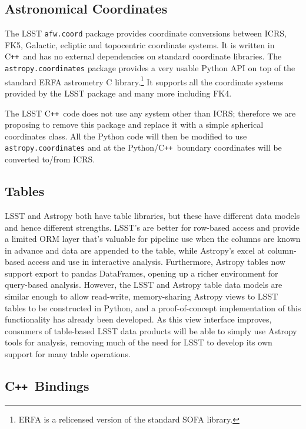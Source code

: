 \documentclass[]{spie}  %
\newcommand{\CPP}{C\texttt{++}\xspace}  %
\begin{document}
\subsection{Astronomical Coordinates}

The LSST \texttt{afw.coord} package provides coordinate conversions between ICRS, FK5, Galactic, ecliptic and topocentric coordinate systems.
It is written in \CPP\ and has no external dependencies on standard coordinate libraries.
The \texttt{astropy.coordinates} package provides a very usable Python API on top of the standard ERFA astrometry C library.\footnote{ERFA is a relicensed version of the standard SOFA library\cite{2011SchpJ...611404H}.}
It supports all the coordinate systems provided by the LSST package and many more including FK4.

The LSST \CPP\ code does not use any system other than ICRS; therefore we are proposing to remove this package and replace it with a simple spherical coordinates class.
All the Python code will then be modified to use \texttt{astropy.coordinates} and at the Python/\CPP\ boundary coordinates will be converted to/from ICRS.

\subsection{Tables}

LSST and Astropy both have table libraries, but these have different data models and hence different strengths.
LSST's are better for row-based access and provide a limited ORM layer that's valuable for pipeline use when the columns are known in advance and data are appended to the table, while Astropy's excel at column-based access and use in interactive analysis.
Furthermore, Astropy tables now support export to pandas DataFrames\cite{mckinney-proc-scipy-2010}, opening up a richer environment for query-based analysis.
However, the LSST and Astropy table data models are similar enough to allow read-write, memory-sharing Astropy views to LSST tables to be constructed in Python, and a proof-of-concept implementation of this functionality has already been developed.
As this view interface improves, consumers of table-based LSST data products will be able to simply use Astropy tools for analysis, removing much of the need for LSST to develop its own support for many table operations.

\subsection{\CPP\ Bindings}
\end{document}
